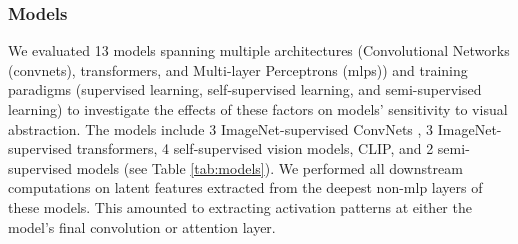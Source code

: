 \documentclass[10pt,letterpaper]{article}
\begin{document}
\subsubsection{Models} 
We evaluated 13 models spanning multiple architectures (Convolutional Networks (convnets), transformers, and Multi-layer Perceptrons (mlps)) and training paradigms (supervised learning, self-supervised learning, and semi-supervised learning) to investigate the effects of these factors on models' sensitivity to visual abstraction. 
The models include 3 ImageNet-supervised ConvNets \cite{deng2009imagenet}, 3 ImageNet-supervised transformers, 4 self-supervised vision models, CLIP, and 2 semi-supervised models (see Table \ref{tab:models}). 
We performed all downstream computations on latent features extracted from the deepest non-mlp layers of these models. This amounted to extracting activation patterns at either the model's final convolution or attention layer.


\end{document}
